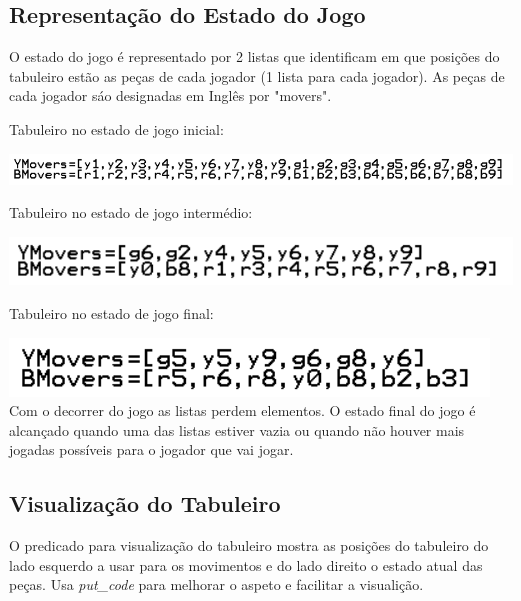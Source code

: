 \documentclass[a4paper]{article}
\begin{document}
\subsection{Representação do Estado do Jogo} O estado do jogo é representado por 2 listas que identificam em que posições do tabuleiro estão as peças de cada jogador (1 lista para cada jogador). As peças de cada jogador sáo designadas em Inglês por "movers".\linebreak
\begin{flushleft} 
Tabuleiro no estado de jogo inicial:
\end{flushleft}
\includegraphics[scale=0.6]{initialBoard.png}\linebreak\linebreak
\begin{flushleft} 
Tabuleiro no estado de jogo intermédio:
\end{flushleft}
\includegraphics[scale=0.6]{midBoard.png}\linebreak\linebreak
\begin{flushleft} 
Tabuleiro no estado de jogo final:
\end{flushleft}
\includegraphics[scale=0.6]{finalBoard.png}\linebreak\linebreak 
Com o decorrer do jogo as listas perdem elementos. O estado final do jogo é alcançado quando uma das listas estiver vazia ou quando não houver mais jogadas possíveis para o jogador que vai jogar.


\subsection{Visualização do Tabuleiro} O predicado para visualização do tabuleiro mostra as posições do tabuleiro do lado esquerdo a usar para os movimentos e do lado direito o estado atual das peças.  Usa \textit{put\_code} para melhorar o aspeto e facilitar a visualição. 
\end{document}

